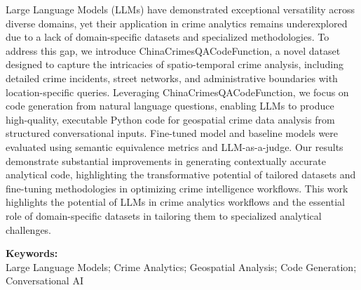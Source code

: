 

Large Language Models (LLMs) have demonstrated exceptional versatility across diverse domains, yet their application in crime analytics remains underexplored due to a lack of domain-specific datasets and specialized methodologies. To address this gap, we introduce ChinaCrimesQACodeFunction, a novel dataset designed to capture the intricacies of spatio-temporal crime analysis, including detailed crime incidents, street networks, and administrative boundaries with location-specific queries. Leveraging ChinaCrimesQACodeFunction, we focus on code generation from natural language questions, enabling LLMs to produce high-quality, executable Python code for geospatial crime data analysis from structured conversational inputs. Fine-tuned model and baseline models were evaluated using semantic equivalence metrics and LLM-as-a-judge. Our results demonstrate substantial improvements in generating contextually accurate analytical code, highlighting the transformative potential of tailored datasets and fine-tuning methodologies in optimizing crime intelligence workflows. This work highlights the potential of LLMs in crime analytics workflows and the essential role of domain-specific datasets in tailoring them to specialized analytical challenges.

\noindent \textbf{Keywords:}\\
\noindent Large Language Models; Crime Analytics; Geospatial Analysis; Code Generation; Conversational AI